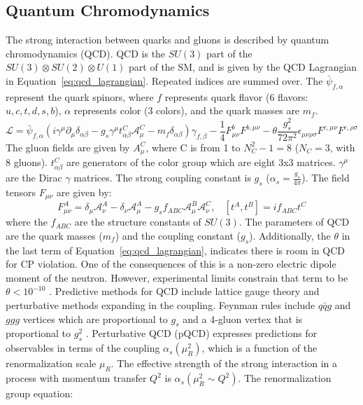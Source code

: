 
\subsection{Quantum Chromodynamics}\label{ch:sm:qcd}
The strong interaction between quarks and gluons is described by quantum chromodynamics (QCD). QCD is the $SU(3)$ part of the $SU(3)\otimes SU(2)\otimes U(1)$ part of the SM, and is given by the QCD Lagrangian in Equation~\ref{eq:qcd_lagrangian}. Repeated indices are summed over. The $\bar{\psi}_{f,\alpha}$ represent the quark spinors, where $f$ represents quark flavor (6 flavors: $u,c,t,d,s,b$), $\alpha$ represents color (3 colors), and the quark masses are $m_f$. 
\begin{equation}
    \mathcal{L}=\bar{\psi}_{f,\alpha}(i\gamma^\mu \partial_\mu \delta_{\alpha\beta}-g_s\gamma^\mu t^C_{\alpha\beta}\mathcal{A}^C_\mu-m_f\delta_{\alpha\beta})\gamma_{f,\beta}-\frac{1}{4}F^b_{\mu\nu}F^{b,\mu\nu}-\theta\frac{g^2_{s}}{72\pi^2}\epsilon_{\mu\nu\rho\sigma}F^{c,\mu\nu}F^{c,\rho\sigma}
    \label{eq:qcd_lagrangian}
\end{equation}
The gluon fields are given by $A^C_\mu$, where C is from 1 to $N_C^2 - 1 = 8$ ($N_C = 3$, with 8 gluons). $t^C_{\alpha\beta}$ are generators of the color group which are eight 3x3 matrices. $\gamma^\mu$ are the Dirac $\gamma$ matrices. The strong coupling constant is $g_s$ ($\alpha_s = \frac{g_s}{4\pi}$).  The field tensors $F_{\mu\nu}$ are given by: 
\begin{equation}
F_{\mu\nu}^A = \delta_{\mu} \mathcal{A}^A_{\nu} - \delta_{\nu} \mathcal{A}^A_\mu - g_s f_{ABC} \mathcal{A}_\mu^B \mathcal{A}_\nu^C,~~~~ [t^A, t^B] = if_{ABC}t^C
\label{eq:qcd_field_tensors}
\end{equation}
where the $f_{ABC}$ are the structure constants of $SU(3)$. 
The parameters of QCD are the quark masses ($m_f$) and the coupling constant ($g_s$). Additionally, the $\theta$ in the last term of Equation~\ref{eq:qcd_lagrangian}, indicates there is room in QCD for CP violation. One of the consequences of this is a non-zero electric dipole moment of the neutron. However, experimental limits constrain that term to be $\theta < 10^{-10}$ \cite{PhysRevLett.97.131801}.
Predictive methods for QCD include lattice gauge theory and perturbative methods expanding in the coupling. Feynman rules include $q\bar{q}g$ and $ggg$ vertices which are proportional to $g_s$ and a 4-gluon vertex that is proportional to $g_s^2$ \cite{Ellis:1991qj}. Perturbative QCD (pQCD) expresses predictions for observables in terms of the coupling $\alpha_s(\mu_R^2)$, which is a function of the renormalization scale $\mu_R$. The effective strength of the strong interaction in a process with momentum transfer $Q^2$ is $\alpha_s(\mu_R^2 \sim Q^2)$. The renormalization group equation:
